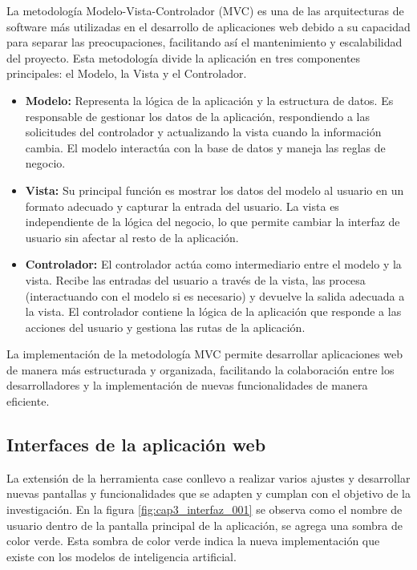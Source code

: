 La metodología Modelo-Vista-Controlador (MVC) es una de las arquitecturas de software más utilizadas en el desarrollo de aplicaciones web debido a su capacidad para separar las preocupaciones, facilitando así el mantenimiento y escalabilidad del proyecto. Esta metodología divide la aplicación en tres componentes principales: el Modelo, la Vista y el Controlador.

\begin{itemize}
	\item \textbf{Modelo:} Representa la lógica de la aplicación y la estructura de datos. Es responsable de gestionar los datos de la aplicación, respondiendo a las solicitudes del controlador y actualizando la vista cuando la información cambia. El modelo interactúa con la base de datos y maneja las reglas de negocio.
	\item \textbf{Vista:} Su principal función es mostrar los datos del modelo al usuario en un formato adecuado y capturar la entrada del usuario. La vista es independiente de la lógica del negocio, lo que permite cambiar la interfaz de usuario sin afectar al resto de la aplicación.
	\item \textbf{Controlador:} El controlador actúa como intermediario entre el modelo y la vista. Recibe las entradas del usuario a través de la vista, las procesa (interactuando con el modelo si es necesario) y devuelve la salida adecuada a la vista. El controlador contiene la lógica de la aplicación que responde a las acciones del usuario y gestiona las rutas de la aplicación.
\end{itemize}

La implementación de la metodología MVC permite desarrollar aplicaciones web de manera más estructurada y organizada, facilitando la colaboración entre los desarrolladores y la implementación de nuevas funcionalidades de manera eficiente.

\subsection{Interfaces de la aplicación web}

La extensión de la herramienta case conllevo a realizar varios ajustes y desarrollar nuevas pantallas y funcionalidades que se adapten y cumplan con el objetivo de la investigación. En la figura \ref{fig:cap3_interfaz_001} se observa como el nombre de usuario dentro de la pantalla principal de la aplicación, se agrega una sombra de color verde. Esta sombra de color verde indica la nueva implementación que existe con los modelos de inteligencia artificial.

